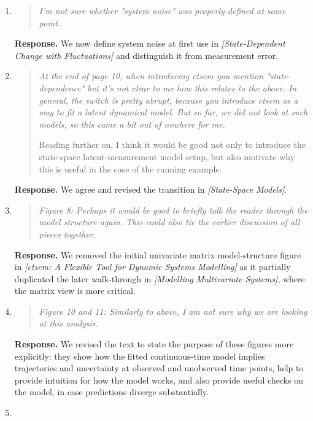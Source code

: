 \documentclass[11pt]{article}
\newcommand{\response}{\textbf{Response.} }
\newcommand{\secit}[1]{\textit{[#1]}}
\newenvironment{reviewerpoint}{\begin{quote}\itshape}{\end{quote}}
\begin{document}
\begin{enumerate}[label=\textbf{Reviewer 1, Minor Point \arabic*.}]
\response We revised this language in \secit{Simulating Continuous-Time Dynamics} to use ``arbitrarily small'' and limit-based wording where appropriate.
\item

\begin{reviewerpoint}
I'm not sure whether "system noise" was properly defined at some point.
\end{reviewerpoint}

\response We now define system noise at first use in \secit{State-Dependent Change with Fluctuations} and distinguish it from measurement error.
\item

\begin{reviewerpoint}
At the end of page 10, when introducing ctsem you mention "state-dependence" but it's not clear to me how this relates to the above.
In general, the switch is pretty abrupt, because you introduce ctsem as a way to fit a latent dynamical model.
But so far, we did not look at such models, so this came a bit out of nowhere for me.

Reading further on, I think it would be good not only to introduce the state-space latent-measurement model setup, but also motivate why this is useful in the case of the running example.
\end{reviewerpoint}

\response We agree and revised the transition in \secit{State-Space Models}.
\item

\begin{reviewerpoint}
Figure 8: Perhaps it would be good to briefly talk the reader through the model structure again.
This could also tie the earlier discussion of all pieces together.
\end{reviewerpoint}

\response We removed the initial univariate matrix model-structure figure in \secit{ctsem: A Flexible Tool for Dynamic Systems Modelling} as it partially duplicated the later walk-through in \secit{Modelling Multivariate Systems}, where the matrix view is more critical.
\item

\begin{reviewerpoint}
Figure 10 and 11: Similarly to above, I am not sure why we are looking at this analysis.
\end{reviewerpoint}

\response We revised the text to state the purpose of these figures more explicitly: they show how the fitted continuous-time model implies trajectories and uncertainty at observed and unobserved time points, help to provide intuition for how the model works, and also provide useful checks on the model, in case predictions diverge substantially.
\item


\end{enumerate}
\end{document}
